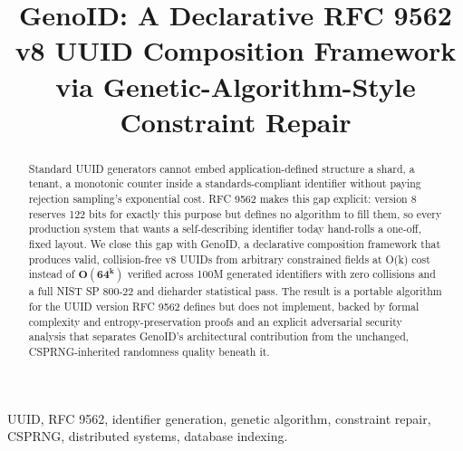 \documentclass[conference]{IEEEtran}
\begin{document}
\title
{GenoID: A Declarative RFC 9562 v8 UUID Composition Framework via Genetic-Algorithm-Style Constraint Repair\\}

\author{
\and
{}
\and
{}
}

\maketitle

\begin{abstract}
Standard UUID generators cannot embed application-defined structure a shard, a tenant, a monotonic counter inside a standards-compliant identifier without paying rejection sampling's exponential cost. RFC 9562 makes this gap explicit: version 8 reserves 122 bits for exactly this purpose but defines no algorithm to fill them, so every production system that wants a self-describing identifier today hand-rolls a one-off, fixed layout. We close this gap with GenoID, a declarative composition framework that produces valid, collision-free v8 UUIDs from arbitrary constrained fields at O(k) cost instead of $\bm{O(64^k)}$ verified across 100M generated identifiers with zero collisions and a full NIST SP 800-22 and dieharder statistical pass. The result is a portable algorithm for the UUID version RFC 9562 defines but does not implement, backed by formal complexity and entropy-preservation proofs and an explicit adversarial security analysis that separates GenoID's architectural contribution from the unchanged, CSPRNG-inherited randomness quality beneath it.
\end{abstract}

\begin{IEEEkeywords}
UUID, RFC 9562, identifier generation, genetic algorithm, constraint repair, CSPRNG, distributed systems, database indexing.
\end{IEEEkeywords}
\end{document}

